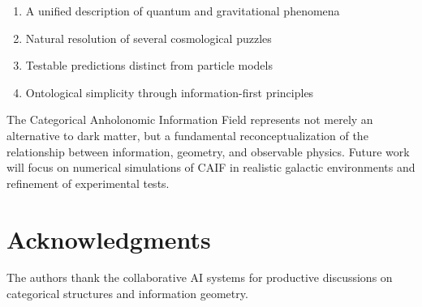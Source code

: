 \documentclass[11pt]{article}
\theoremstyle{definition}
\theoremstyle{remark}
\begin{document}
\begin{enumerate}
\item A unified description of quantum and gravitational phenomena
\item Natural resolution of several cosmological puzzles
\item Testable predictions distinct from particle models
\item Ontological simplicity through information-first principles
\end{enumerate}

The Categorical Anholonomic Information Field represents not merely an alternative to dark matter, but a fundamental reconceptualization of the relationship between information, geometry, and observable physics. Future work will focus on numerical simulations of CAIF in realistic galactic environments and refinement of experimental tests.

\section*{Acknowledgments}
The authors thank the collaborative AI systems for productive discussions on categorical structures and information geometry.



\end{document}
